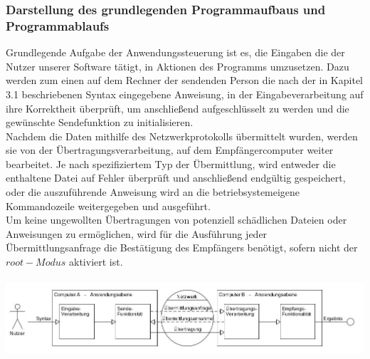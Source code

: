 \subsubsection{Darstellung des grundlegenden Programmaufbaus und Programmablaufs}
Grundlegende Aufgabe der Anwendungssteuerung ist es, die Eingaben die der Nutzer unserer Software tätigt, in Aktionen des Programms umzusetzen. Dazu werden zum einen auf dem Rechner der sendenden Person die nach der in Kapitel 3.1 beschriebenen Syntax eingegebene Anweisung, in der Eingabeverarbeitung auf ihre Korrektheit überprüft, um anschließend aufgeschlüsselt zu werden und die gewünschte Sendefunktion zu initialisieren.\\
Nachdem die Daten mithilfe des Netzwerkprotokolls übermittelt wurden, werden sie von der Übertragungsverarbeitung, auf dem Empfängercomputer weiter bearbeitet. Je nach spezifiziertem Typ der Übermittlung, wird entweder die enthaltene Datei auf Fehler überprüft und anschließend endgültig gespeichert, oder die auszuführende Anweisung wird an die betriebsystemeigene Kommandozeile weitergegeben und ausgeführt.\\
Um keine ungewollten Übertragungen von potenziell schädlichen Dateien oder Anweisungen zu ermöglichen, wird für die Ausführung jeder Übermittlungsanfrage die Bestätigung des Empfängers benötigt, sofern nicht der $root-Modus$ aktiviert ist.\\\hfill\\
\includegraphics[scale=.45]{anw.jpg}
